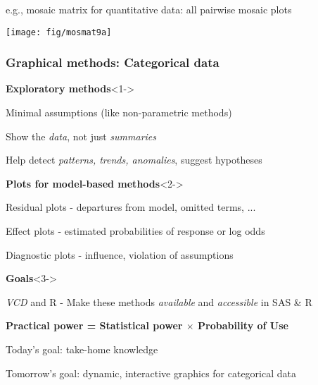 \begin{frame}
    \begin{itemize*}
		\item e.g., mosaic matrix for quantitative data: all pairwise mosaic plots
	\end{itemize*}
	  \vspace{1ex}
	  \begin{center}
	  \texttt{[image: fig/mosmat9a]}
	  \end{center}
\end{frame}

\begin{frame}
 \frametitle{Graphical methods: Categorical data}
  \begin{block}{\large\bfseries Exploratory methods}<1->
      \begin{itemize*}
	  \item Minimal assumptions (like non-parametric methods)
	  \item Show the \emph{data}, not just \emph{summaries} 
	  \item Help detect \emph{patterns, trends, anomalies}, suggest hypotheses
	  \end{itemize*}
   \end{block}

	\begin{block}{\large\bfseries Plots for model-based methods}<2->
      \begin{itemize*}
	  \item Residual plots - departures from model, omitted terms, ...
	  \item Effect plots - estimated probabilities of response or log odds 
	  \item Diagnostic plots - influence, violation of assumptions
	  \end{itemize*}
   \end{block}

	\begin{block}{\large\bfseries Goals}<3->
      \begin{itemize*}
	  \item \emph{VCD} and R  - Make these methods \emph{available} and \emph{accessible} in SAS \& R
	  \item {\bf Practical power = Statistical power \(\times\) Probability of Use}
	  \item Today's goal:  take-home knowledge
	  \item Tomorrow's goal: dynamic, interactive graphics for categorical data 
	  \end{itemize*}
   \end{block}
\end{frame}

